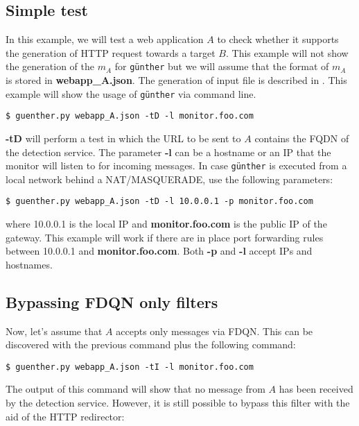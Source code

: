 \documentclass[10pt,a4paper]{article}
\newcommand{\g}{\texttt{g\"{u}nther}}
\begin{document}
\subsection{Simple test}

In this example, we will test a web application $A$ to check whether it supports
the generation of HTTP request towards a target $B$. This example will not show
the generation of the $m_A$ for \g{} but we will assume that the format of $m_A$
is stored in \textbf{webapp\_A.json}. The generation of input file is described
in . This example will show the usage of \g{} via command
line.

\begin{verbatim}
$ guenther.py webapp_A.json -tD -l monitor.foo.com
\end{verbatim}

\textbf{-tD} will perform a test in which the URL to be sent to $A$ contains the
FQDN of the detection service. The parameter \textbf{-l} can be a hostname or an IP that the monitor will listen to for incoming messages. In case \g{} is executed from a local network behind a NAT/MASQUERADE, use the following parameters:

\begin{verbatim}
$ guenther.py webapp_A.json -tD -l 10.0.0.1 -p monitor.foo.com
\end{verbatim}

where 10.0.0.1 is the local IP and \textbf{monitor.foo.com} is the public IP of
the gateway. This example will work if there are in place port forwarding rules
between 10.0.0.1 and \textbf{monitor.foo.com}. Both \textbf{-p} and \textbf{-l}
accept IPs and hostnames.

\subsection{Bypassing FDQN only filters}

Now, let's assume that $A$ accepts only messages via FDQN. This can be
discovered with the previous command plus the following command:

\begin{verbatim}
$ guenther.py webapp_A.json -tI -l monitor.foo.com
\end{verbatim}

The output of this command will show that no message from $A$ has been received
by the detection service. However, it is still possible to bypass this filter
with the aid of the HTTP redirector:
\end{document}
